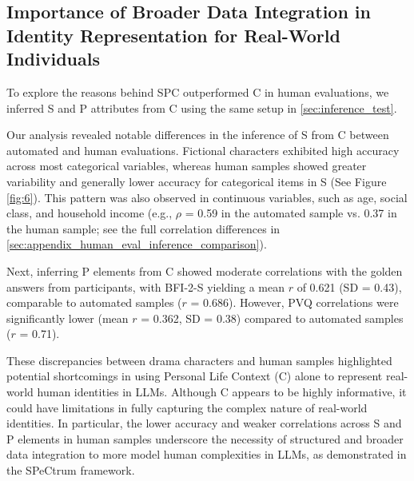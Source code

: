 \subsection{Importance of Broader Data Integration in Identity Representation for Real-World Individuals}
To explore the reasons behind SPC outperformed C in human evaluations, we inferred S and P attributes from C using the same setup in \ref{sec:inference_test}.

Our analysis revealed notable differences in the inference of S from C between automated and human evaluations. Fictional characters exhibited high accuracy across most categorical variables, whereas human samples showed greater variability and generally lower accuracy for categorical items in S (See Figure \ref{fig:6}). This pattern was also observed in continuous variables, such as age, social class, and household income (e.g., $\rho$ = 0.59 in the automated sample vs. 0.37 in the human sample; see the full correlation differences in \ref{sec:appendix_human_eval_inference_comparison}).

Next, inferring P elements from C showed moderate correlations with the golden answers from participants, with BFI-2-S yielding a mean $r$  of 0.621 (SD = 0.43), comparable to automated samples ($r$ = 0.686). However, PVQ correlations were significantly lower (mean $r$ = 0.362, SD = 0.38) compared to automated samples ($r$  = 0.71).

These discrepancies between drama characters and human samples highlighted potential shortcomings in using Personal Life Context (C) alone to represent real-world human identities in LLMs. Although C appears to be highly informative, it could have limitations in fully capturing the complex nature of real-world identities. In particular, the lower accuracy and weaker correlations across S and P elements in human samples underscore the necessity of structured and broader data integration to more model human complexities in LLMs, as demonstrated in the SPeCtrum framework.

